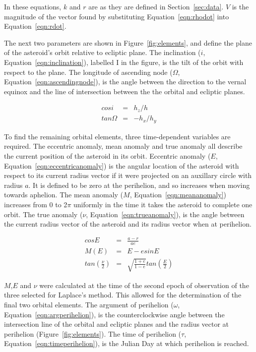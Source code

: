 \documentclass[a4paper,12pt]{article}
\begin{document}
In these equations, $k$ and $r$ are as they are defined in Section~\ref{sec:data}. $V$ is the magnitude of the vector found by substituting Equation~\ref{eqn:rhodot} into Equation~\ref{eqn:rdot}.

The next two parameters are shown in Figure~\ref{fig:elements}, and define the plane of the asteroid's orbit relative to ecliptic plane.  The inclination ($i$, Equation~\ref{eqn:inclination}), labelled I in the figure, is the tilt of the orbit with respect to the plane. The longitude of ascending node ($\Omega$, Equation~\ref{eqn:ascendingnode}), is the angle between the direction to the vernal equinox and the line of intersection between the the orbital and ecliptic planes.

\begin{eqnarray}
\label{eqn:inclination}
cosi &=& h_z/h\\
\label{eqn:ascendingnode}
tan\Omega &=& -h_x/h_y
\end{eqnarray}

To find the remaining orbital elements, three time-dependent variables are required. The eccentric anomaly, mean anomaly and true anomaly all describe the current position of the asteroid in its orbit. Eccentric anomaly ($E$, Equation~\ref{eqn:eccentricanomaly}) is the angular location of the asteroid with respect to its current radius vector if it were projected on an auxillary circle with radius $a$. It is defined to be zero at the perihelion, and so increases when moving towards aphelion. The mean anomaly ($M$, Equation~\ref{eqn:meananomaly}) increases from 0 to 2$\pi$ uniformly in the time it takes the asteroid to complete one orbit. The true anomaly ($\nu$, Equation~\ref{eqn:trueanomaly}), is the angle between the current radius vector of the asteroid and its radius vector when at perihelion.

\begin{eqnarray}
\label{eqn:eccentricanomaly}
cosE &=& \frac{a-r}{ae}\\
\label{eqn:meananomaly}
M(E) &=& E - esinE\\
\label{eqn:trueanomaly}
tan\left(\frac{\nu}{2}\right) &=& \sqrt{\frac{1+e}{1-e}}tan\left(\frac{E}{2}\right)
\end{eqnarray}

$M$,$E$ and $\nu$ were calculated at the time of the second epoch of observation of the three selected for Laplace's method. This allowed for the determination of the final two orbital elements. The argument of perihelion ($\omega$, Equation~\ref{eqn:argperihelion}), is the counterclockwise angle between the intersection line of the orbital and ecliptic planes and the radius vector at perihelion (Figure~\ref{fig:elements}). The time of perihelion ($\tau$, Equation~\ref{eqn:timeperihelion}), is the Julian Day at which perihelion is reached.
\end{document}
